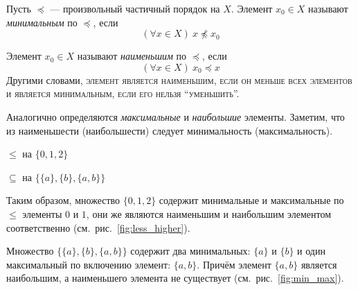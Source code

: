 Пусть $\preceq$ --- произвольный частичный порядок на $X$.
Элемент $x_0\in X$ называют {\it минимальным}
по $\preceq$, если
\[
	(\forall x\in X)~x\npreceq x_0
\]

Элемент $x_0\in X$ называют {\it наименьшим}
 по $\preceq$, если
\[
	(\forall x\in X)~x_0\preceq x
\]
Другими словами, \textsc{элемент является наименьшим,
	если он меньше всех элементов и является минимальным, если его нельзя
	``уменьшить''.}

Аналогично определяются {\it максимальные} и {\it наибольшие} элементы.
Заметим, что из наименьшести (наибольшести) следует минимальность (максимальность).

\begin{marginfigure}
	\center

	\caption{$\leq$ на $\{0,1,2\}$}\label{fig:less_higher}
\end{marginfigure}

\begin{marginfigure}
	\center

	\caption{$\subseteq$ на $\{\{a\},\{b\},\{a,b\}\}$}\label{fig:min_max}
\end{marginfigure}

Таким образом, множество $\{0,1,2\}$ содержит минимальные и максимальные по $\leq$
элементы $0$ и $1$, они же являются наименьшим и
наибольшим элементом соответственно (см.~рис.~\ref{fig:less_higher}).

Множество $\{\{a\},\{b\},\{a,b\}\}$ содержит
два минимальных: $\{a\}$ и $\{b\}$ и один максимальный
по включению элемент: $\{a,b\}$. Причём элемент $\{a,b\}$ является наибольшим, а
наименьшего элемента не существует (см.~рис.~\ref{fig:min_max}).

